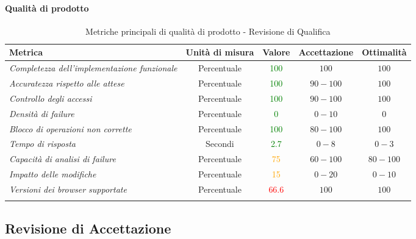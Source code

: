 \paragraph{Qualità di prodotto}
\begin{longtable}{|>{\centering}m{5cm}|c|c|c|c|}
\hline
\textbf{Metrica} & \textbf{Unità di misura} & \textbf{Valore} & \textbf{Accettazione} & \textbf{Ottimalità}\\
\hline
\endhead
\emph{Completezza dell'implementazione funzionale} & {Percentuale} & \textcolor{Green}{100} & $100$ & $100$\\ \hline
\emph{Accuratezza rispetto alle attese} & {Percentuale} & \textcolor{Green}{100} & $90 - 100$ & $100$\\ \hline
\emph{Controllo degli accessi} & {Percentuale} & \textcolor{Green}{100} & $90 - 100$ & $100$\\ \hline
\emph{Densità di failure} & {Percentuale} & \textcolor{Green}{0} & $0 - 10$  & $0$\\ \hline
\emph{Blocco di operazioni non corrette} & {Percentuale} & \textcolor{Green}{100} & $80 - 100$  & $100$\\ \hline
\emph{Tempo di risposta} & {Secondi} & \textcolor{Green}{2.7} & $0 - 8$ & $0 - 3$\\ \hline
\emph{Capacità di analisi di failure} & {Percentuale} & \textcolor{Orange}{75} & $60 - 100$ & $80 - 100$\\ \hline
\emph{Impatto delle modifiche} & {Percentuale} & \textcolor{Orange}{15} & $0 - 20$ & $0 - 10$\\ \hline
\emph{Versioni dei browser supportate} & {Percentuale} & \textcolor{Red}{66.6} & $100$ & $100$\\ \hline
\caption{Metriche principali di qualità di prodotto - Revisione di Qualifica}
\end{longtable}

\subsection{Revisione di Accettazione}

